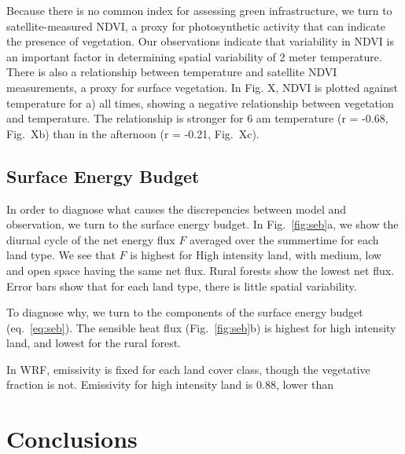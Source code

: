 \documentclass[draft,linenumbers]{agujournal}
\begin{document}
Because there is no common index for assessing green infrastructure, we turn to satellite-measured NDVI, a proxy for photosynthetic activity that can indicate the presence of vegetation. Our observations indicate that variability in NDVI is an important factor in determining spatial variability of 2 meter temperature. 
There is also a relationship between temperature and satellite NDVI measurements, a proxy for surface vegetation. In Fig. X, NDVI is plotted against temperature for a) all times, showing a negative relationship between vegetation and temperature. The relationship is stronger for 6 am temperature (r = -0.68, Fig.~Xb) than in the afternoon (r = -0.21, Fig.~Xc). 

\subsection{Surface Energy Budget}
In order to diagnose what causes the discrepencies between model and observation, we turn to the surface energy budget. In Fig.~\ref{fig:seb}a, we show the diurnal cycle of the net energy flux $F$ averaged over the summertime for each land type. We see that $F$ is highest for  High intensity land, with medium, low and open space having the same net flux. Rural forests show the lowest net flux. Error bars show that for each land type, there is little spatial variability.  

To diagnose why, we turn to the components of the surface energy budget (eq.~\ref{eq:seb}). The sensible heat flux (Fig.~\ref{fig:seb}b) is highest for high intensity land, and lowest for the rural forest. 

In WRF, emissivity is fixed for each land cover class, though the vegetative fraction is not. Emissivity for high intensity land is $0.88$, lower than 

\section{Conclusions}\label{sec:conclusions}



\end{document}
